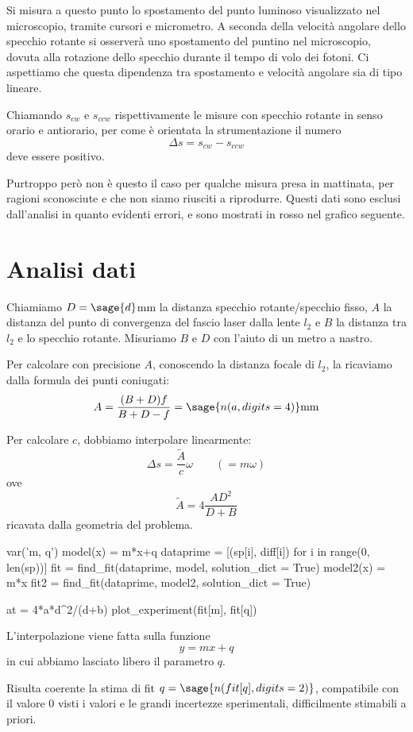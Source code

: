 Si misura a questo punto lo spostamento del punto luminoso visualizzato nel microscopio, tramite cursori e micrometro. A seconda della velocità angolare dello specchio rotante si osserverà uno spostamento del puntino nel microscopio, dovuta alla rotazione dello specchio durante il tempo di volo dei fotoni. Ci aspettiamo che questa dipendenza tra spostamento e velocità angolare sia di tipo lineare.

Chiamando $s_{cw}$ e $s_{ccw}$ rispettivamente le misure con specchio rotante in senso orario e antiorario, per come è orientata la strumentazione il numero
$$\Delta s = s_{cw} - s_{ccw}$$
deve essere positivo.

Purtroppo però non è questo il caso per qualche misura presa in mattinata, per ragioni sconosciute e che non siamo riusciti a riprodurre. Questi dati sono esclusi dall'analisi in quanto evidenti errori, e sono mostrati in rosso nel grafico seguente.

\section{Analisi dati}

Chiamiamo $D = \sage{d}$mm la distanza specchio rotante/specchio fisso, $A$ la distanza del punto di convergenza del fascio laser dalla lente $l_2$ e $B$ la distanza tra $l_2$ e lo specchio rotante. Misuriamo $B$ e $D$ con l'aiuto di un metro a nastro.

Per calcolare con precisione $A$, conoscendo la distanza focale di $l_2$, la ricaviamo dalla formula dei punti coniugati:
$$A=\frac{(B+D)f}{B+D-f} = \sage{n(a, digits=4)} \text{mm}$$


Per calcolare $c$, dobbiamo interpolare linearmente:
$$\Delta s = \frac{\tilde{A}}{c}\omega\qquad (= m\omega)$$
ove
$$\tilde{A} = 4\frac{AD^2}{D+B}$$
ricavata dalla geometria del problema.

\begin{sagesilent}
var('m, q')
model(x) = m*x+q
dataprime = [(sp[i], diff[i]) for i in range(0, len(sp))]
fit = find_fit(dataprime, model, solution_dict = True)
model2(x) = m*x
fit2 = find_fit(dataprime, model2, solution_dict = True)

at = 4*a*d^2/(d+b)
plot_experiment(fit[m], fit[q]) 
\end{sagesilent}

L'interpolazione viene fatta sulla funzione
$$y=mx+q$$
in cui abbiamo lasciato libero il parametro $q$.

Risulta coerente la stima di fit $q=\sage{n(fit[q], digits=2)}$, compatibile con il valore 0 visti i valori e le grandi incertezze sperimentali, difficilmente stimabili a priori.

